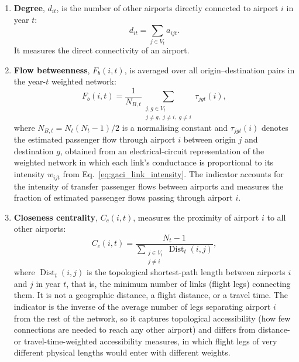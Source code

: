 \begin{enumerate}
    \item \textbf{Degree}, $d_{it}$, is the number of other airports directly connected to airport $i$ in year $t$:
    \begin{equation}
        d_{it} = \sum_{j\in V_t} a_{ijt}.
        \label{eq:gaci_degree}
    \end{equation}
    It measures the direct connectivity of an airport.

    \item \textbf{Flow betweenness}, $F_b(i,t)$, is averaged over all origin--destination pairs in the year-$t$ weighted network:
    \begin{equation}
        F_b(i,t)
        =
        \frac{1}{N_{B,t}}
        \sum_{\substack{
            j,g\in V_t \\
            j\neq g,\; j\neq i,\; g\neq i
        }}
        \tau_{jgt}(i),
        \label{eq:gaci_flow_betweenness}
    \end{equation}
    where $N_{B,t} = N_t(N_t-1)/2$ is a normalising constant and $\tau_{jgt}(i)$ denotes the estimated passenger flow through airport $i$ between origin $j$ and destination $g$, obtained from an electrical-circuit representation of the weighted network in which each link's conductance is proportional to its intensity $w_{ijt}$ from Eq.~\eqref{eq:gaci_link_intensity}. The indicator accounts for the intensity of transfer passenger flows between airports and measures the fraction of estimated passenger flows passing through airport $i$.

    \item \textbf{Closeness centrality}, $C_c(i,t)$, measures the proximity of airport $i$ to all other airports:
    \begin{equation}
        C_c(i,t)
        =
        \frac{N_t-1}
        {\displaystyle
        \sum_{\substack{
            j\in V_t \\
            j\neq i
        }}
        \operatorname{Dist}_t(i,j)},
        \label{eq:gaci_closeness}
    \end{equation}
    where $\operatorname{Dist}_t(i,j)$ is the topological shortest-path length between airports $i$ and $j$ in year $t$, that is, the minimum number of links (flight legs) connecting them. It is not a geographic distance, a flight distance, or a travel time. The indicator is the inverse of the average number of legs separating airport $i$ from the rest of the network, so it captures topological accessibility (how few connections are needed to reach any other airport) and differs from distance- or travel-time-weighted accessibility measures, in which flight legs of very different physical lengths would enter with different weights.


\end{enumerate}
